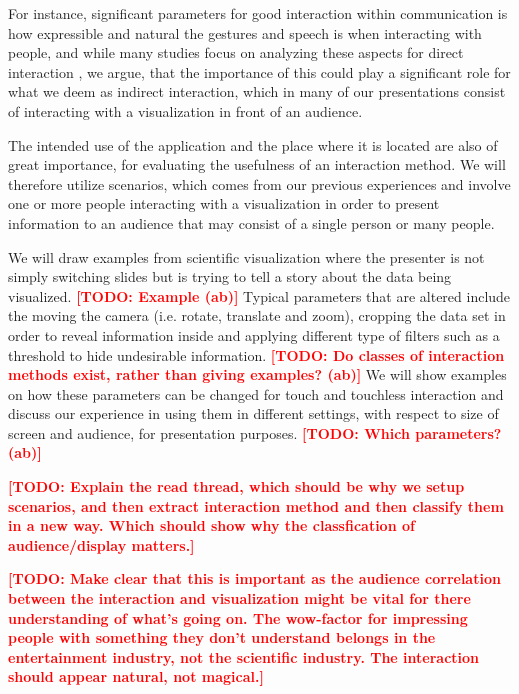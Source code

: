 \documentclass[review,journal]{vgtc}         %
\newcommand{\todo}[1]{\textbf{\textcolor{red}{[TODO: {#1}]}}}
\begin{document}
For instance, significant parameters for good interaction within communication is how expressible and natural the gestures and speech is when interacting with people, and while many studies focus on analyzing these aspects for direct interaction \cite{978-3-642-12552-2, Caridakis:2013:NIE:2504335.2504378}, we argue, that the importance of this could play a significant role for what we deem as indirect interaction, which in many of our presentations consist of interacting with a visualization in front of an audience.

The intended use of the application and the place where it is located are also of great importance, for evaluating the usefulness of an interaction method.
We will therefore utilize scenarios, which comes from our previous experiences and involve one or more people interacting with a visualization in order to present information to an audience that may consist of a single person or many people.
  
We will draw examples from scientific visualization where the presenter is not simply switching slides but is trying to tell a story about the data being visualized. \todo{Example (ab)}
Typical parameters that are altered include the moving the camera (i.e. rotate, translate and zoom), cropping the data set in order to reveal information inside and applying different type of filters such as a threshold to hide undesirable information. \todo{Do classes of interaction methods exist, rather than giving examples? (ab)}
We will show examples on how these parameters can be changed for touch and touchless interaction and discuss our experience in using them in different settings, with respect to size of screen and audience, for presentation purposes. \todo{Which parameters? (ab)}

\todo{Explain the read thread, which should be why we setup scenarios, and then extract interaction method and then classify them in a new way. Which should show why the classfication of audience/display matters.}

\todo{Make clear that this is important as the audience correlation between the interaction and visualization might be vital for there understanding of what's going on. The wow-factor for impressing people with something they don't understand belongs in the entertainment industry, not the scientific industry. The interaction should appear natural, not magical.}

%
\end{document}
